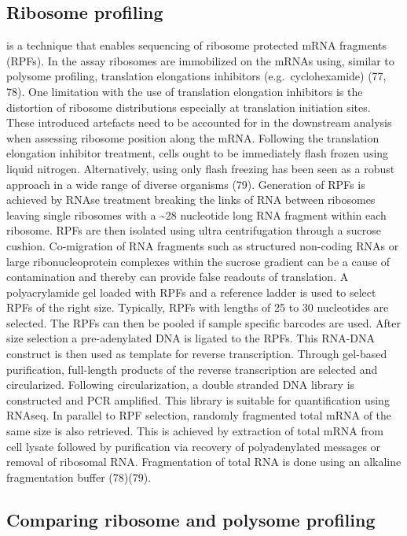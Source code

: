 \documentclass[12pt,openany]{book}
\begin{document}
\subsection{Ribosome profiling}

is a technique that enables sequencing of ribosome protected mRNA
fragments (RPFs). In the assay ribosomes are immobilized on the mRNAs
using, similar to polysome profiling, translation elongations inhibitors
(e.g.~cyclohexamide) (77, 78). One limitation with the use of
translation elongation inhibitors is the distortion of ribosome
distributions especially at translation initiation sites. These
introduced artefacts need to be accounted for in the downstream analysis
when assessing ribosome position along the mRNA. Following the
translation elongation inhibitor treatment, cells ought to be
immediately flash frozen using liquid nitrogen. Alternatively, using
only flash freezing has been seen as a robust approach in a wide range
of diverse organisms (79). Generation of RPFs is achieved by RNAse
treatment breaking the links of RNA between ribosomes leaving single
ribosomes with a \textasciitilde{}28 nucleotide long RNA fragment within
each ribosome. RPFs are then isolated using ultra centrifugation through
a sucrose cushion. Co-migration of RNA fragments such as structured
non-coding RNAs or large ribonucleoprotein complexes within the sucrose
gradient can be a cause of contamination and thereby can provide false
readouts of translation. A polyacrylamide gel loaded with RPFs and a
reference ladder is used to select RPFs of the right size. Typically,
RPFs with lengths of 25 to 30 nucleotides are selected. The RPFs can
then be pooled if sample specific barcodes are used. After size
selection a pre-adenylated DNA is ligated to the RPFs. This RNA-DNA
construct is then used as template for reverse transcription. Through
gel-based purification, full-length products of the reverse
transcription are selected and circularized. Following circularization,
a double stranded DNA library is constructed and PCR amplified. This
library is suitable for quantification using RNAseq. In parallel to RPF
selection, randomly fragmented total mRNA of the same size is also
retrieved. This is achieved by extraction of total mRNA from cell lysate
followed by purification via recovery of polyadenylated messages or
removal of ribosomal RNA. Fragmentation of total RNA is done using an
alkaline fragmentation buffer (78)(79).

\subsection{Comparing ribosome and polysome profiling}
\end{document}
